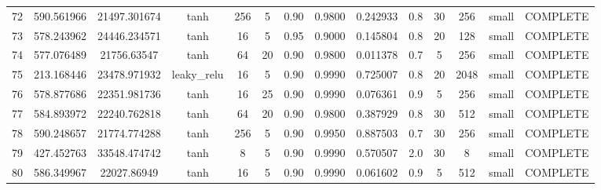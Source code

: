 \begin{longtable}{cccccccccccccc}
                       72 &                 590.561966 &                       21497.301674 &            tanh &         256 &              5 &        0.90 & 0.9800 &       0.242933 &             0.8 &                 30 &      256 &     small & COMPLETE \\
                       73 &                 578.243962 &                       24446.234571 &            tanh &          16 &              5 &        0.95 & 0.9000 &       0.145804 &             0.8 &                 20 &      128 &     small & COMPLETE \\
                       74 &                 577.076489 &                        21756.63547 &            tanh &          64 &             20 &        0.90 & 0.9800 &       0.011378 &             0.7 &                  5 &      256 &     small & COMPLETE \\
                       75 &                 213.168446 &                       23478.971932 &     leaky\_relu &          16 &              5 &        0.90 & 0.9990 &       0.725007 &             0.8 &                 20 &     2048 &     small & COMPLETE \\
                       76 &                 578.877686 &                       22351.981736 &            tanh &          16 &             25 &        0.90 & 0.9990 &       0.076361 &             0.9 &                  5 &      256 &     small & COMPLETE \\
                       77 &                 584.893972 &                       22240.762818 &            tanh &          64 &             20 &        0.90 & 0.9800 &       0.387929 &             0.8 &                 30 &      512 &     small & COMPLETE \\
                       78 &                 590.248657 &                       21774.774288 &            tanh &         256 &              5 &        0.90 & 0.9950 &       0.887503 &             0.7 &                 30 &      256 &     small & COMPLETE \\
                       79 &                 427.452763 &                       33548.474742 &            tanh &           8 &              5 &        0.90 & 0.9990 &       0.570507 &             2.0 &                 30 &        8 &     small & COMPLETE \\
                       80 &                 586.349967 &                        22027.86949 &            tanh &          16 &              5 &        0.90 & 0.9990 &       0.061602 &             0.9 &                  5 &      512 &     small & COMPLETE \\

\end{longtable}

